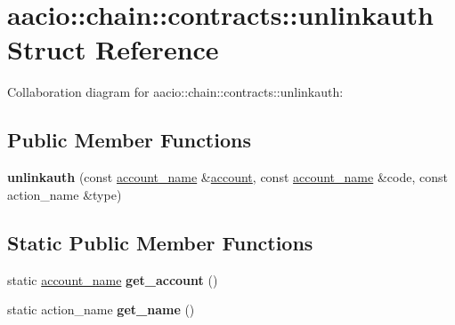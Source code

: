 \hypertarget{structaacio_1_1chain_1_1contracts_1_1unlinkauth}{}\section{aacio\+:\+:chain\+:\+:contracts\+:\+:unlinkauth Struct Reference}
\label{structaacio_1_1chain_1_1contracts_1_1unlinkauth}


Collaboration diagram for aacio\+:\+:chain\+:\+:contracts\+:\+:unlinkauth\+:
\subsection*{Public Member Functions}
\begin{DoxyCompactItemize}
\item 
\mbox{\label{structaacio_1_1chain_1_1contracts_1_1unlinkauth_a9b8203f8630e6b631e1ee878362a82d0}} 
{\bfseries unlinkauth} (const \mbox{\hyperlink{structaacio_1_1chain_1_1name}{account\+\_\+name}} \&\mbox{\hyperlink{structaccount}{account}}, const \mbox{\hyperlink{structaacio_1_1chain_1_1name}{account\+\_\+name}} \&code, const action\+\_\+name \&type)
\end{DoxyCompactItemize}
\subsection*{Static Public Member Functions}
\begin{DoxyCompactItemize}
\item 
\mbox{\label{structaacio_1_1chain_1_1contracts_1_1unlinkauth_af63b87e1e1b8ed7ee2bd31fd4b6fd522}} 
static \mbox{\hyperlink{structaacio_1_1chain_1_1name}{account\+\_\+name}} {\bfseries get\+\_\+account} ()
\item 
\mbox{\label{structaacio_1_1chain_1_1contracts_1_1unlinkauth_a02976bd8de70158b44bb6e0151ec161f}} 
static action\+\_\+name {\bfseries get\+\_\+name} ()
\end{DoxyCompactItemize}
